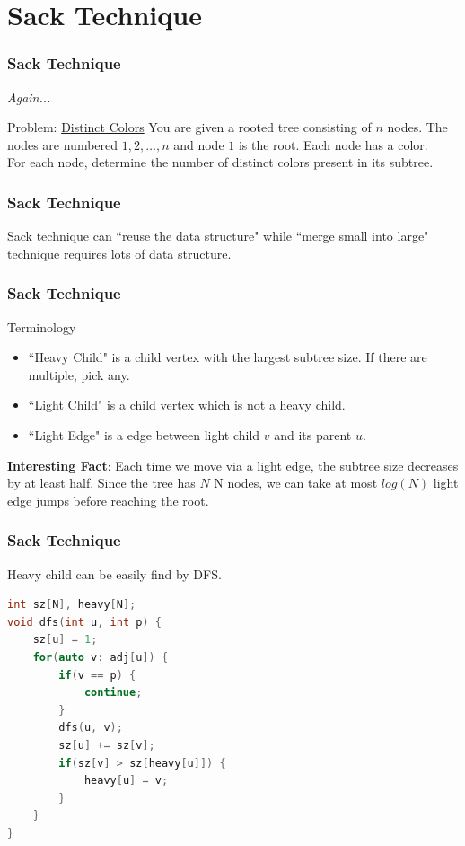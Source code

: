 \section{Sack Technique}

\begin{frame}
\frametitle{Sack Technique}
\textit{Again...}
\begin{block}{Problem: \href{https://cses.fi/problemset/task/1139}{Distinct Colors}}
You are given a rooted tree consisting of $n$ nodes. The nodes are numbered $1, 2, \ldots, n$ and node $1$ is the root. Each node has a color.\\
For each node, determine the number of distinct colors present in its subtree.
\end{block}
\end{frame}

\begin{frame}
\frametitle{Sack Technique}  
Sack technique can ``reuse the data structure" while ``merge small into large" technique requires lots of data structure.
\end{frame}

\begin{frame}
\frametitle{Sack Technique}  
\Large Terminology

\normalsize
\begin{itemize}
    \item ``Heavy Child" is a child vertex with the largest subtree size. If there are multiple, pick any.
    \item ``Light Child" is a child vertex which is not a heavy child.
    \item ``Light Edge" is a edge between light child $v$ and its parent $u$.
\end{itemize}

\medskip

\textbf{Interesting Fact}: Each time we move via a light edge, the subtree size decreases by at least half. Since the tree has $N$
N nodes, we can take at most $log(N)$ light edge jumps before reaching the root.

\end{frame}

\begin{frame}[fragile]
\frametitle{Sack Technique}  
Heavy child can be easily find by DFS.

\begin{lstlisting}[language=C++, basicstyle=\small]
int sz[N], heavy[N];
void dfs(int u, int p) {
    sz[u] = 1;
    for(auto v: adj[u]) {
        if(v == p) {
            continue;
        }
        dfs(u, v);
        sz[u] += sz[v];
        if(sz[v] > sz[heavy[u]]) {
            heavy[u] = v;
        }
    }
}
\end{lstlisting}
\end{frame}

